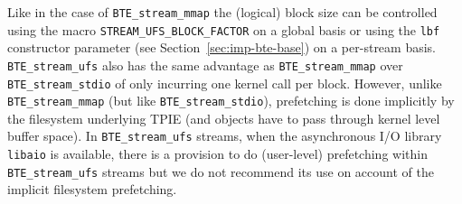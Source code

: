 Like in the case of \lstinline|BTE_stream_mmap| the (logical) block
size can be controlled using the macro
\lstinline|STREAM_UFS_BLOCK_FACTOR| on a global basis or using the
\lstinline|lbf| constructor parameter (see
Section~\ref{sec:imp-bte-base}) on a per-stream basis.
\lstinline|BTE_stream_ufs| also has the same advantage as
\lstinline|BTE_stream_mmap| over \lstinline|BTE_stream_stdio| of only
incurring one kernel call per block. However, unlike
\lstinline|BTE_stream_mmap| (but like \lstinline|BTE_stream_stdio|),
prefetching is done implicitly by the filesystem underlying TPIE (and
objects have to pass through kernel level buffer space).
In \lstinline|BTE_stream_ufs| streams, when the asynchronous I/O
library \lstinline|libaio|
is available, there is a provision to do (user-level) prefetching
within \lstinline|BTE_stream_ufs| streams but we do not recommend its
use on account of the implicit filesystem prefetching.



  
